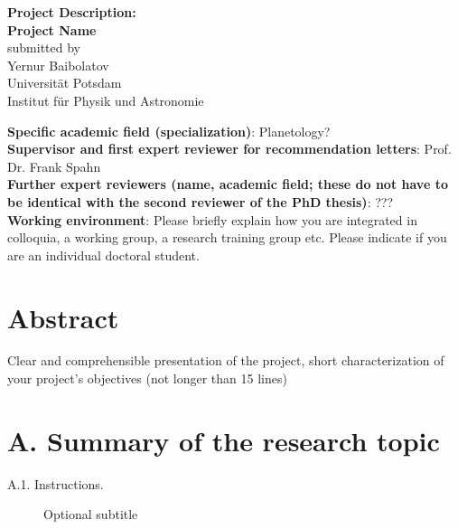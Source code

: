 \documentclass[11pt, notitlepage]{article} %
\begin{document}

\begin{center}
{\Large \textbf{Project Description:}}\\  
\vspace{.5cm}
{\LARGE\textbf{Project Name}} 
\\[.75cm] 
submitted by\\
{Yernur Baibolatov\\
Universit\"at Potsdam\\
Institut f\"ur Physik und Astronomie}
\end{center}
\noindent\textbf{Specific academic field (specialization)}: Planetology?
\\[.75cm] 
\textbf{Supervisor and first expert reviewer for recommendation letters}: Prof. Dr. Frank Spahn
\\[.75cm] 
\textbf{Further expert reviewers (name, academic field; these do not have to be identical with the second reviewer of the PhD thesis)}: ???
\\[.75cm] 
\textbf{Working environment}: Please  briefly  explain  how you  are  integrated  in  colloquia, a  working  group,   a  research  training group etc.  Please indicate if you are an individual doctoral student.

\section*{Abstract}
Clear  and  comprehensible  presentation  of  the  project,  short  characterization  of  your  project’s  objectives (not longer than 15 lines)



\newpage

\section*{A. Summary of the research topic}

\begin{description} %
	\item[A.1. Instructions.]{Optional subtitle}
\end{description}
\end{document}
